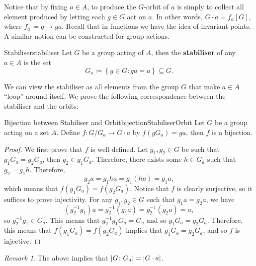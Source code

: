 \documentclass[math]{amznotes}
\theoremstyle{remark}
\newtheorem*{remark}{Remark}
\newcommand{\0}{\mathbf{0}}
\newcommand{\1}{\mathbf{1}}
\begin{document}
Notice that by fixing $a \in A$, to produce the $G$-orbit of $a$ is simply to collect all element produced by letting each $g \in G$ act on $a$. In other words, $G \cdot a = f_a\left[G\right]$, where $f_a \coloneqq g \to ga$. Recall that in functions we have the idea of invariant points. A similar notion can be constructed for group actions.
\begin{dfnbox}{Stabiliser}{stabiliser}
    Let $G$ be a group acting of $A$, then the {\color{red} \textbf{stabiliser}} of any $a \in A$ is the set 
    \begin{equation*}
        G_a \coloneqq \left\{g \in G \colon ga = a\right\} \subseteq G.
    \end{equation*}
\end{dfnbox}
We can view the stabiliser as all elements from the group $G$ that make $a \in A$ ``loop'' around itself. We prove the following correspondence between the stabiliser and the orbits:
\begin{probox}{Bijection between Stabiliser and Orbit}{bijectionStabiliserOrbit}
    Let $G$ be a group acting on a set $A$. Define $f \colon G \slash G_a \to G \cdot a$ by $f\left(gG_a\right) = ga$, then $f$ is a bijection.
    \tcblower
    \begin{proof}
        We first prove that $f$ is well-defined. Let $g_1, g_2 \in G$ be such that $g_1G_a = g_2G_a$, then $g_2 \in g_1G_a$. Therefore, there exists some $h \in G_a$ such that $g_2 = g_1h$. Therefore,
        \begin{equation*}
            g_2a = g_1ha = g_1\left(ha\right) = g_1a,
        \end{equation*}
        which means that $f\left(g_1G_a\right) = f\left(g_2G_a\right)$. Notice that $f$ is clearly surjective, so it suffices to prove injectivity. For any $g_1, g_2 \in G$ such that $g_1a = g_2a$, we have 
        \begin{equation*}
            \left(g_2^{-1}g_1\right)a = g_2^{-1}\left(g_1a\right) = g_2^{-1}\left(g_2a\right) = a,
        \end{equation*}
        so $g_2^{-1}g_1 \in G_a$. This means that $g_2^{-1}g_1G_a = G_a$ and so $g_1G_a = g_2G_a$. Therefore, this means that $f\left(g_1G_a\right) = f\left(g_2G_a\right)$ implies that $g_1G_a = g_2G_a$, and so $f$ is injective.
    \end{proof}
\end{probox}
\begin{notebox}
    \begin{remark}
        The above implies that ${\left\lvert {G \colon G_a} \right\rvert} = {\left\lvert {G \cdot a} \right\rvert}$.
    \end{remark}
\end{notebox}
\end{document}

